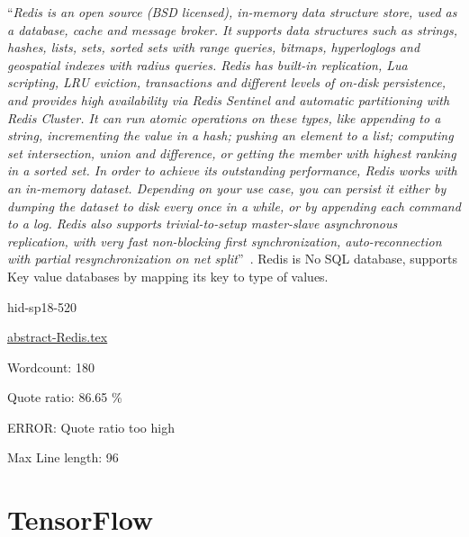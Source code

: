 \color{blue}``\emph{Redis is an open source (BSD licensed), in-memory data structure store, used
as a database, cache and message broker. It supports data structures such as
strings, hashes, lists, sets, sorted sets with range queries, bitmaps, 
hyperloglogs and geospatial indexes with radius queries. Redis has built-in 
replication, Lua scripting, LRU eviction, transactions and different levels 
of on-disk persistence, and provides high availability via Redis Sentinel and
automatic partitioning with Redis Cluster.
It can run atomic operations on these types, like appending to a string, 
incrementing the value in a hash; pushing an element to a list; computing set
intersection, union and difference, or getting the member with highest 
ranking in a sorted set.
In order to achieve its outstanding performance, Redis works with an in-memory
dataset. Depending on your use case, you can persist it either by dumping the
dataset to disk every once in a while, or by appending each command to a log.
Redis also supports trivial-to-setup master-slave asynchronous replication, 
with very fast non-blocking first synchronization, auto-reconnection with 
partial resynchronization on net split}''\color{black}~\cite{hid-sp18-520-Redis}.
Redis is No SQL database, supports Key value databases by mapping its key
to type of values.


\begin{IU}

hid-sp18-520

\href{https://github.com/cloudmesh-community/hid-sp18-520/blob/master//technology/abstract-Redis.tex}{abstract-Redis.tex}

 

Wordcount: 180


Quote ratio: 86.65 \%

ERROR: Quote ratio too high
 
Max Line length: 96
\end{IU}

\section{TensorFlow}


